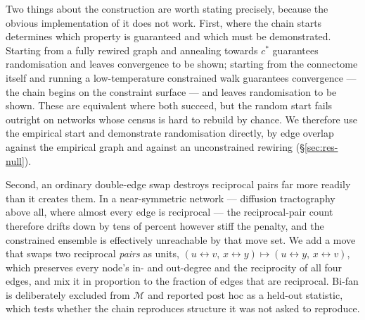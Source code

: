 Two things about the construction are worth stating precisely, because the obvious
implementation of it does not work. First, where the chain starts determines which
property is guaranteed and which must be demonstrated. Starting from a fully rewired
graph and annealing towards $c^{*}$ guarantees randomisation and leaves convergence to
be shown; starting from the connectome itself and running a low-temperature constrained
walk guarantees convergence --- the chain begins on the constraint surface --- and
leaves randomisation to be shown. These are equivalent where both succeed, but the
random start fails outright on networks whose census is hard to rebuild by chance. We
therefore use the empirical start and demonstrate randomisation directly, by edge
overlap against the empirical graph and against an unconstrained rewiring
(\S\ref{sec:res-null}).

Second, an ordinary double-edge swap destroys reciprocal pairs far more readily than it
creates them. In a near-symmetric network --- diffusion tractography above all, where
almost every edge is reciprocal --- the reciprocal-pair count therefore drifts down by
tens of percent however stiff the penalty, and the constrained ensemble is effectively
unreachable by that move set. We add a move that swaps two reciprocal \emph{pairs} as
units, $(u \leftrightarrow v,\, x \leftrightarrow y) \mapsto (u \leftrightarrow y,\,
x \leftrightarrow v)$, which preserves every node's in- and out-degree and the
reciprocity of all four edges, and mix it in proportion to the fraction of edges that
are reciprocal.
Bi-fan is deliberately excluded from $\mathcal{M}$ and reported post hoc as a
held-out statistic, which tests whether the chain reproduces structure it was not
asked to reproduce.

